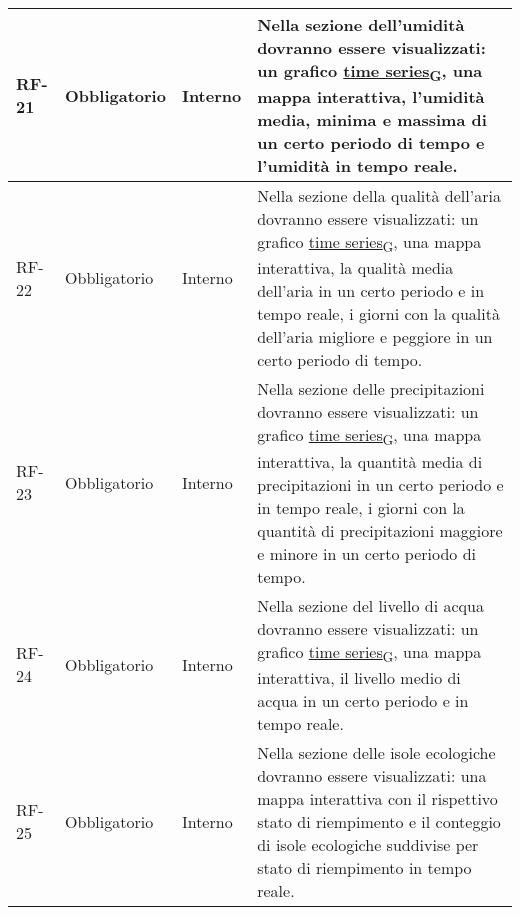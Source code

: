 \begin{longtable}{|>{\centering\arraybackslash}m{}|>{\centering\arraybackslash}m{}|>{\centering\arraybackslash}m{}|>{\centering\arraybackslash}m{}|}
	\\\hline
	RF-21           & Obbligatorio        & Interno                                                                                                           & Nella sezione dell'umidità dovranno essere visualizzati: un grafico \href{https://7last.github.io/docs/pb/documentazione-interna/glossario\#time-series}{time series\textsubscript{G}}, una mappa interattiva, l'umidità media, minima e massima di un certo periodo di tempo e l'umidità in tempo reale.
	\\\hline
	RF-22           & Obbligatorio        & Interno                                                                                                           & Nella sezione della qualità dell'aria dovranno essere visualizzati: un grafico \href{https://7last.github.io/docs/pb/documentazione-interna/glossario\#time-series}{time series\textsubscript{G}}, una mappa interattiva, la qualità media dell'aria in un certo periodo e in tempo reale, i giorni con la qualità dell'aria migliore e peggiore in un certo periodo di tempo.
	\\\hline
	RF-23           & Obbligatorio        & Interno                                                                                                           & Nella sezione delle precipitazioni dovranno essere visualizzati: un grafico \href{https://7last.github.io/docs/pb/documentazione-interna/glossario\#time-series}{time series\textsubscript{G}}, una mappa interattiva, la quantità media di precipitazioni in un certo periodo e in tempo reale, i giorni con la quantità di precipitazioni maggiore e minore in un certo periodo di tempo.
	\\\hline
	RF-24           & Obbligatorio        & Interno                                                                                                           & Nella sezione del livello di acqua dovranno essere visualizzati: un grafico \href{https://7last.github.io/docs/pb/documentazione-interna/glossario\#time-series}{time series\textsubscript{G}}, una mappa interattiva, il livello medio di acqua in un certo periodo e in tempo reale.
	\\\hline
	RF-25           & Obbligatorio        & Interno                                                                                                           & Nella sezione delle isole ecologiche dovranno essere visualizzati: una mappa interattiva con il rispettivo stato di riempimento e il conteggio di isole ecologiche suddivise per stato di riempimento in tempo reale.
	\\\hline

\end{longtable}
